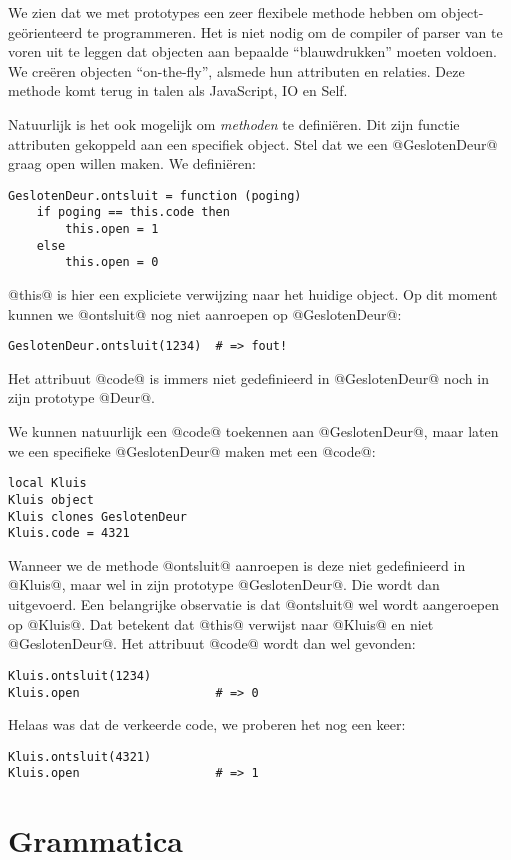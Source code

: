 We zien dat we met prototypes een zeer flexibele methode hebben om object-geörienteerd te programmeren. Het is niet nodig om de compiler of parser van te voren uit te leggen dat objecten aan bepaalde ``blauwdrukken'' moeten voldoen. We creëren objecten ``on-the-fly'', alsmede hun attributen en relaties. Deze methode komt terug in talen als JavaScript, IO en Self.

Natuurlijk is het ook mogelijk om \emph{methoden} te definiëren. Dit zijn functie attributen gekoppeld aan een specifiek object. Stel dat we een @GeslotenDeur@ graag open willen maken. We definiëren:
\begin{lstlisting}[name=deuren]
GeslotenDeur.ontsluit = function (poging)
    if poging == this.code then
        this.open = 1
    else
        this.open = 0
\end{lstlisting}
@this@ is hier een expliciete verwijzing naar het huidige object. Op dit moment kunnen we @ontsluit@ nog niet aanroepen op @GeslotenDeur@:
\begin{lstlisting}[name=deuren]
GeslotenDeur.ontsluit(1234)  # => fout!
\end{lstlisting}
Het attribuut @code@ is immers niet gedefinieerd in @GeslotenDeur@ noch in zijn prototype @Deur@.

We kunnen natuurlijk een @code@ toekennen aan @GeslotenDeur@, maar laten we een specifieke @GeslotenDeur@ maken met een @code@:
\begin{lstlisting}[name=deuren]
local Kluis
Kluis object
Kluis clones GeslotenDeur
Kluis.code = 4321
\end{lstlisting}
Wanneer we de methode @ontsluit@ aanroepen is deze niet gedefinieerd in @Kluis@, maar wel in zijn prototype @GeslotenDeur@. Die wordt dan uitgevoerd. Een belangrijke observatie is dat @ontsluit@ wel wordt aangeroepen op @Kluis@. Dat betekent dat @this@ verwijst naar @Kluis@ en niet @GeslotenDeur@. Het attribuut @code@ wordt dan wel gevonden:
\begin{lstlisting}[name=deuren]
Kluis.ontsluit(1234)
Kluis.open                   # => 0
\end{lstlisting}
Helaas was dat de verkeerde code, we proberen het nog een keer:
\begin{lstlisting}[name=deuren]
Kluis.ontsluit(4321)
Kluis.open                   # => 1
\end{lstlisting}


\section{Grammatica}

